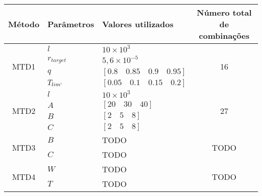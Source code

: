 \begin{table}[htb]
{
	\begin{tabular}{cllc}
		\toprule
		Método 					& Parâmetros	& Valores utilizados						& Número total de combinações \\
		\midrule \midrule					
		\multirow{4}{*}{MTD1}	& $l$			& $10 \times 10^3$							& \multirow{4}{*}{16} \\
								& $r_{target}$	& $5,6 \times 10^{-5}$						& \\
								& $q$			& $[0.8 \quad 0.85 \quad 0.9 \quad 0.95]$	& \\
								& $T_{lim`}$	& $[0.05 \quad 0.1 \quad 0.15 \quad 0.2]$	& \\
		\midrule
		\multirow{4}{*}{MTD2}	& $l$			& $10 \times 10^3$							& \multirow{4}{*}{27} \\
								& $A$			& $[20 \quad 30 \quad 40]$					& \\
								& $B$			& $[2 \quad 5 \quad 8]$						& \\
								& $C$			& $[2 \quad 5 \quad 8]$						& \\
		\midrule					
		\multirow{2}{*}{MTD3}	& $B$			& TODO										& \multirow{2}{*}{TODO} \\
								& $C$			& TODO										& \\
		\midrule					
		\multirow{2}{*}{MTD4}	& $W$			& TODO										& \multirow{2}{*}{TODO} \\
								& $T$			& TODO										& \\
		\bottomrule
	\end{tabular}
}{}
\end{table}
